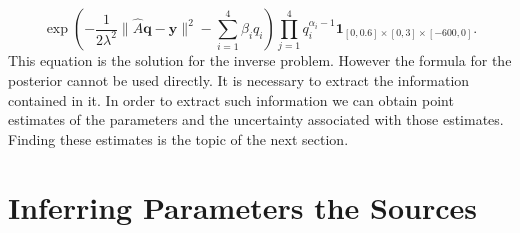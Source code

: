 \documentclass{sfuthesis}
\newcommand{\q}{\textbf{q}}
\newcommand{\y}{\textbf{y}}
\begin{document}
\begin{equation}\label{eqnPosteriorFinal}
\exp\left(-\frac{1}{2\lambda^{2}}\|\widehat{A}\q-\y\|^{2}-\sum_{i=1}^{4}\beta_{i}q_{i}\right)\prod_{j=1}^{4}q_{i}^{\alpha_{i}-1}\textbf{1}_{[0,0.6]\times[0,3]\times[-600,0]}.
\end{equation}
This equation is the solution for the inverse problem. However the formula for the posterior cannot be used directly. It is
necessary to extract the information contained in it. In order to extract such information we can
obtain point estimates of the parameters and the uncertainty associated with those estimates. 
Finding these estimates is the topic of the next section.



\section{Inferring  Parameters the Sources}
\end{document}
